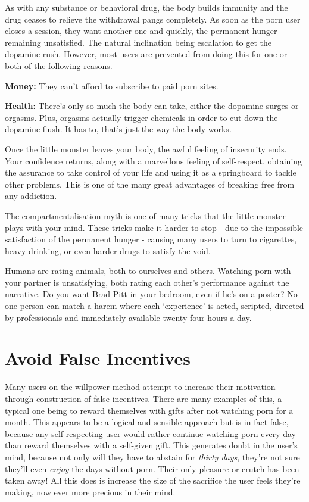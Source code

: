 \documentclass[
]{book}
\begin{document}
As with any substance or behavioral drug, the body builds immunity and the drug ceases to relieve the withdrawal pangs completely. As soon as the porn user closes a session, they want another one and quickly, the permanent hunger remaining unsatisfied. The natural inclination being escalation to get the dopamine rush. However, most users are prevented from doing this for one or both of the following reasons.

\textbf{Money:} They can't afford to subscribe to paid porn sites.

\textbf{Health:} There's only so much the body can take, either the dopamine surges or orgasms. Plus, orgasms actually trigger chemicals in order to cut down the dopamine flush. It has to, that's just the way the body works.

Once the little monster leaves your body, the awful feeling of insecurity ends. Your confidence returns, along with a marvellous feeling of self-respect, obtaining the assurance to take control of your life and using it as a springboard to tackle other problems. This is one of the many great advantages of breaking free from any addiction.

The compartmentalisation myth is one of many tricks that the little monster plays with your mind. These tricks make it harder to stop - due to the impossible satisfaction of the permanent hunger - causing many users to turn to cigarettes, heavy drinking, or even harder drugs to satisfy the void.

Humans are rating animals, both to ourselves and others. Watching porn with your partner is unsatisfying, both rating each other's performance against the narrative. Do you want Brad Pitt in your bedroom, even if he's on a poster? No one person can match a harem where each `experience' is acted, scripted, directed by professionals and immediately available twenty-four hours a day.

\hypertarget{avoid-false-incentives}{%
\chapter{Avoid False Incentives}\label{avoid-false-incentives}}

Many users on the willpower method attempt to increase their motivation through construction of false incentives. There are many examples of this, a typical one being to reward themselves with gifts after not watching porn for a month. This appears to be a logical and sensible approach but is in fact false, because any self-respecting user would rather continue watching porn every day than reward themselves with a self-given gift. This generates doubt in the user's mind, because not only will they have to abstain for \emph{thirty days}, they're not sure they'll even \emph{enjoy} the days without porn. Their only pleasure or crutch has been taken away! All this does is increase the size of the sacrifice the user feels they're making, now ever more precious in their mind.
\end{document}
